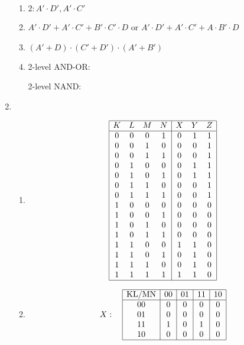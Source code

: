 \documentclass[12pt, a4paper]{article}
\begin{document}
\begin{enumerate}[Q\arabic*.]
\begin{enumerate}[(\alph*.)]
      \item $2: A'\cdot D', A'\cdot C'$

      \item $A'\cdot D' + A'\cdot C' + B'\cdot C'\cdot D$ or $A'\cdot D' + A'\cdot C' + A\cdot B'\cdot D$

      \item $(A'+D) \cdot (C'+D')\cdot (A'+B')$

      \item 2-level AND-OR:\\

        2-level NAND:\\
    \end{enumerate}

  \item 
    \begin{enumerate}[(\alph*.)]
      \item 
        \[
        \begin{array}{|cccc|ccc|}
        \hline
        K & L & M & N & X & Y & Z \\
        \hline
        0 & 0 & 0 & 1 & 0 & 1 & 1 \\
        0 & 0 & 1 & 0 & 0 & 0 & 1 \\
        0 & 0 & 1 & 1 & 0 & 0 & 1 \\
        0 & 1 & 0 & 0 & 0 & 1 & 1 \\
        0 & 1 & 0 & 1 & 0 & 1 & 1 \\
        0 & 1 & 1 & 0 & 0 & 0 & 1 \\
        0 & 1 & 1 & 1 & 0 & 0 & 1 \\
        1 & 0 & 0 & 0 & 0 & 0 & 0 \\
        1 & 0 & 0 & 1 & 0 & 0 & 0 \\
        1 & 0 & 1 & 0 & 0 & 0 & 0 \\
        1 & 0 & 1 & 1 & 0 & 0 & 0 \\
        1 & 1 & 0 & 0 & 1 & 1 & 0 \\
        1 & 1 & 0 & 1 & 0 & 1 & 0 \\
        1 & 1 & 1 & 0 & 0 & 1 & 0 \\
        1 & 1 & 1 & 1 & 1 & 1 & 0 \\
        \hline
        \end{array}
        \]

      \item 
        \[
        X: \quad
        \begin{array}{|c|c|c|c|c|}
        \hline
        \text{KL/MN} & 00 & 01 & 11 & 10 \\
        \hline
        00 & 0 & 0 & 0 & 0 \\
        01 & 0 & 0 & 0 & 0 \\
        11 & 1 & 0 & 1 & 0 \\
        10 & 0 & 0 & 0 & 0 \\
        \hline
        \end{array}
        \]  


\end{enumerate}
\end{enumerate}
\end{document}
